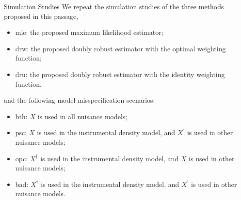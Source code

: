 \documentclass[aspectratio=169,xcolor=dvipsnames]{beamer}
\begin{document}
\begin{frame}{Simulation Studies}
We repeat the simulation studies of the three methods proposed in this passage,
\begin{itemize}
\item mle: the proposed maximum likelihood estimator;
\item drw: the proposed doubly robust estimator with the optimal weighting function;
\item dru: the proposed doubly robust estimator with the identity weighting function.
\end{itemize}

and the following model misspecification scenarios:
\begin{itemize}
\item bth: $X$ is used in all nuisance models;
\item psc: $X$ is used in the instrumental density model, and $X^{\prime}$ is used in other nuisance models; 
\item opc: $X^{\dagger}$ is used in the instrumental density model, and $X$ is used in other nuisance models; 
\item bad: $X^{\dagger}$ is used in the instrumental density model, and $X^{\prime}$ is used in other nuisance models.
\end{itemize}
\end{frame}
\end{document}
